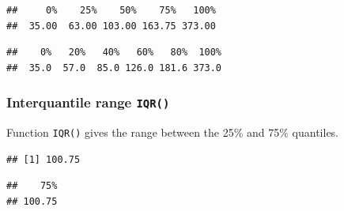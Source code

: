 \documentclass[]{book}
\newenvironment{Shaded}{\begin{snugshade}}{\end{snugshade}}
\newcommand{\CommentTok}[1]{\textcolor[rgb]{0.56,0.35,0.01}{\textit{#1}}}
\newcommand{\DataTypeTok}[1]{\textcolor[rgb]{0.13,0.29,0.53}{#1}}
\newcommand{\DecValTok}[1]{\textcolor[rgb]{0.00,0.00,0.81}{#1}}
\newcommand{\FloatTok}[1]{\textcolor[rgb]{0.00,0.00,0.81}{#1}}
\newcommand{\KeywordTok}[1]{\textcolor[rgb]{0.13,0.29,0.53}{\textbf{#1}}}
\newcommand{\NormalTok}[1]{#1}
\newcommand{\OperatorTok}[1]{\textcolor[rgb]{0.81,0.36,0.00}{\textbf{#1}}}
\newcommand{\StringTok}[1]{\textcolor[rgb]{0.31,0.60,0.02}{#1}}
\begin{document}
\begin{verbatim}
##     0%    25%    50%    75%   100% 
##  35.00  63.00 103.00 163.75 373.00
\end{verbatim}

\begin{Shaded}
\end{Shaded}

\begin{verbatim}
##    0%   20%   40%   60%   80%  100% 
##  35.0  57.0  85.0 126.0 181.6 373.0
\end{verbatim}

\hypertarget{interquantile-range-iqr}{%
\subsubsection*{\texorpdfstring{Interquantile range \texttt{IQR()}}{Interquantile range IQR()}}\label{interquantile-range-iqr}}

Function \texttt{IQR()} gives the range between the 25\% and 75\% quantiles.

\begin{Shaded}
\end{Shaded}

\begin{verbatim}
## [1] 100.75
\end{verbatim}

\begin{Shaded}
\end{Shaded}

\begin{verbatim}
##    75% 
## 100.75
\end{verbatim}
\end{document}
